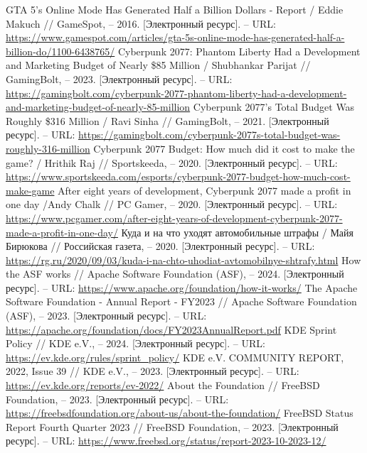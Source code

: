 \documentclass{article}
\begin{document}
\begin{thebibliography}{2}
 GTA 5's Online Mode Has Generated Half a Billion Dollars - Report / Eddie Makuch // GameSpot, – 2016. [Электронный ресурс]. – URL: \url{https://www.gamespot.com/articles/gta-5s-online-mode-has-generated-half-a-billion-do/1100-6438765/}
 Cyberpunk 2077: Phantom Liberty Had a Development and Marketing Budget of Nearly \$85 Million / Shubhankar Parijat // GamingBolt, – 2023. [Электронный ресурс]. – URL: \url{https://gamingbolt.com/cyberpunk-2077-phantom-liberty-had-a-development-and-marketing-budget-of-nearly-85-million}
 Cyberpunk 2077’s Total Budget Was Roughly \$316 Million / Ravi Sinha // GamingBolt, – 2021. [Электронный ресурс]. – URL: \url{https://gamingbolt.com/cyberpunk-2077s-total-budget-was-roughly-316-million}
 Cyberpunk 2077 Budget: How much did it cost to make the game? / Hrithik Raj // Sportskeeda, – 2020. [Электронный ресурс]. – URL: \url{https://www.sportskeeda.com/esports/cyberpunk-2077-budget-how-much-cost-make-game}
 After eight years of development, Cyberpunk 2077 made a profit in one day /Andy Chalk // PC Gamer, – 2020. [Электронный ресурс]. – URL: \url{https://www.pcgamer.com/after-eight-years-of-development-cyberpunk-2077-made-a-profit-in-one-day/}
 Куда и на что уходят автомобильные штрафы / Майя Бирюкова // Российская газета, – 2020. [Электронный ресурс]. – URL: \url{https://rg.ru/2020/09/03/kuda-i-na-chto-uhodiat-avtomobilnye-shtrafy.html}
 How the ASF works // Apache Software Foundation (ASF), – 2024. [Электронный ресурс]. – URL: \url{https://www.apache.org/foundation/how-it-works/}
 The Apache Software Foundation - Annual Report - FY2023 // Apache Software Foundation (ASF), – 2023. [Электронный ресурс]. – URL: \url{https://apache.org/foundation/docs/FY2023AnnualReport.pdf}
 KDE Sprint Policy // KDE e.V., – 2024. [Электронный ресурс]. – URL: \url{https://ev.kde.org/rules/sprint\_policy/}
 KDE e.V. COMMUNITY REPORT, 2022, Issue 39 // KDE e.V., – 2023. [Электронный ресурс]. – URL: \url{https://ev.kde.org/reports/ev-2022/}
 About the Foundation // FreeBSD Foundation, – 2023. [Электронный ресурс]. – URL: \url{https://freebsdfoundation.org/about-us/about-the-foundation/}
 FreeBSD Status Report Fourth Quarter 2023 // FreeBSD Foundation, – 2023. [Электронный ресурс]. – URL: \url{https://www.freebsd.org/status/report-2023-10-2023-12/}

\end{thebibliography}
\end{document}
